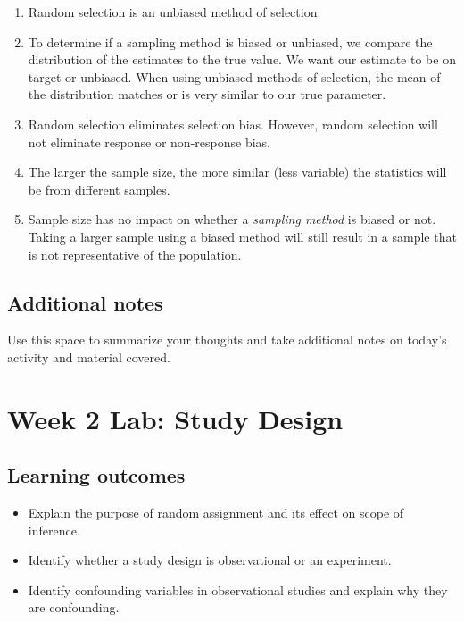 \documentclass[
]{report}
\begin{document}
\begin{enumerate}
\def\labelenumi{\arabic{enumi}.}
\item
  Random selection is an unbiased method of selection.
\item
  To determine if a sampling method is biased or unbiased, we compare the distribution of the estimates to the true value. We want our estimate to be on target or unbiased. When using unbiased methods of selection, the mean of the distribution matches or is very similar to our true parameter.
\item
  Random selection eliminates selection bias. However, random selection will not eliminate response or non-response bias.
\item
  The larger the sample size, the more similar (less variable) the statistics will be from different samples.
\item
  Sample size has no impact on whether a \emph{sampling method} is biased or not. Taking a larger sample using a biased method will still result in a sample that is not representative of the population.
\end{enumerate}

\hypertarget{additional-notes-2}{%
\subsection{Additional notes}\label{additional-notes-2}}

Use this space to summarize your thoughts and take additional notes on today's activity and material covered.

\newpage

\hypertarget{week-2-lab-study-design}{%
\section{Week 2 Lab: Study Design}\label{week-2-lab-study-design}}


\hypertarget{learning-outcomes-3}{%
\subsection{Learning outcomes}\label{learning-outcomes-3}}

\begin{itemize}
\item
  Explain the purpose of random assignment and its effect on scope of inference.
\item
  Identify whether a study design is observational or an experiment.
\item
  Identify confounding variables in observational studies and explain why they are confounding.
\end{itemize}
\end{document}
